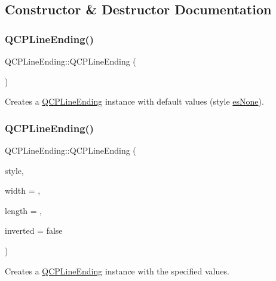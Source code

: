 \subsection{Constructor \& Destructor Documentation}
\mbox{\label{class_q_c_p_line_ending_af2eaf8123b000d97fbd11929c669f61b}} 
\subsubsection{\texorpdfstring{QCPLineEnding()}{QCPLineEnding()}\hspace{0.1cm}{\footnotesize\ttfamily [1/2]}}
{\footnotesize\ttfamily Q\+C\+P\+Line\+Ending\+::\+Q\+C\+P\+Line\+Ending (\begin{DoxyParamCaption}{ }\end{DoxyParamCaption})}

Creates a \mbox{\hyperlink{class_q_c_p_line_ending}{Q\+C\+P\+Line\+Ending}} instance with default values (style \mbox{\hyperlink{class_q_c_p_line_ending_a5ef16e6876b4b74959c7261d8d4c2cd5aca12d500f50cd6871766801bac30fb03}{es\+None}}). \mbox{\label{class_q_c_p_line_ending_abb2abc7542f0c7a3c081d878248896a4}} 
\subsubsection{\texorpdfstring{QCPLineEnding()}{QCPLineEnding()}\hspace{0.1cm}{\footnotesize\ttfamily [2/2]}}
{\footnotesize\ttfamily Q\+C\+P\+Line\+Ending\+::\+Q\+C\+P\+Line\+Ending (\begin{DoxyParamCaption}\item[{\mbox{\hyperlink{class_q_c_p_line_ending_a5ef16e6876b4b74959c7261d8d4c2cd5}{Q\+C\+P\+Line\+Ending\+::\+Ending\+Style}}}]{style,  }\item[{double}]{width = {},  }\item[{double}]{length = {},  }\item[{bool}]{inverted = {\ttfamily false} }\end{DoxyParamCaption})}

Creates a \mbox{\hyperlink{class_q_c_p_line_ending}{Q\+C\+P\+Line\+Ending}} instance with the specified values. 

